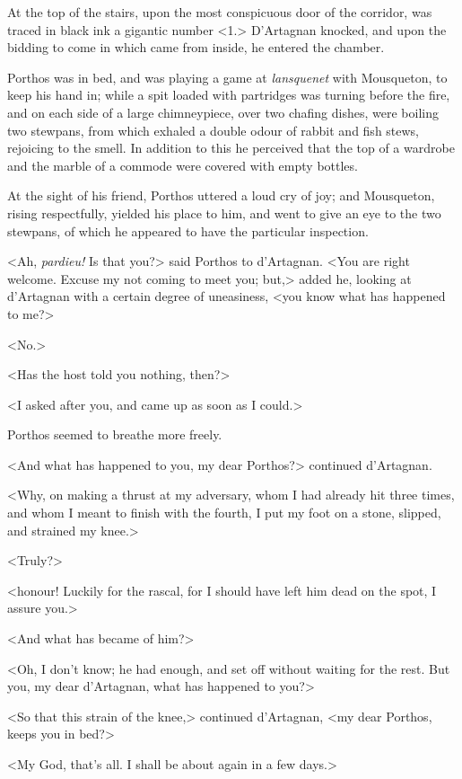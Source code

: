 At the top of the stairs, upon the most conspicuous door of the corridor, was traced in black ink a gigantic number <1.> D'Artagnan knocked, and upon the bidding to come in which came from inside, he entered the chamber. 

Porthos was in bed, and was playing a game at \textit{lansquenet} with Mousqueton, to keep his hand in; while a spit loaded with partridges was turning before the fire, and on each side of a large chimneypiece, over two chafing dishes, were boiling two stewpans, from which exhaled a double odour of rabbit and fish stews, rejoicing to the smell. In addition to this he perceived that the top of a wardrobe and the marble of a commode were covered with empty bottles. 

At the sight of his friend, Porthos uttered a loud cry of joy; and Mousqueton, rising respectfully, yielded his place to him, and went to give an eye to the two stewpans, of which he appeared to have the particular inspection. 

<Ah, \textit{pardieu!} Is that you?> said Porthos to d'Artagnan. <You are right welcome. Excuse my not coming to meet you; but,> added he, looking at d'Artagnan with a certain degree of uneasiness, <you know what has happened to me?> 

<No.> 

<Has the host told you nothing, then?> 

<I asked after you, and came up as soon as I could.> 

Porthos seemed to breathe more freely. 

<And what has happened to you, my dear Porthos?> continued d'Artagnan. 

<Why, on making a thrust at my adversary, whom I had already hit three times, and whom I meant to finish with the fourth, I put my foot on a stone, slipped, and strained my knee.> 

<Truly?> 

<honour! Luckily for the rascal, for I should have left him dead on the spot, I assure you.> 

<And what has became of him?> 

<Oh, I don't know; he had enough, and set off without waiting for the rest. But you, my dear d'Artagnan, what has happened to you?> 

<So that this strain of the knee,> continued d'Artagnan, <my dear Porthos, keeps you in bed?> 

<My God, that's all. I shall be about again in a few days.> 

